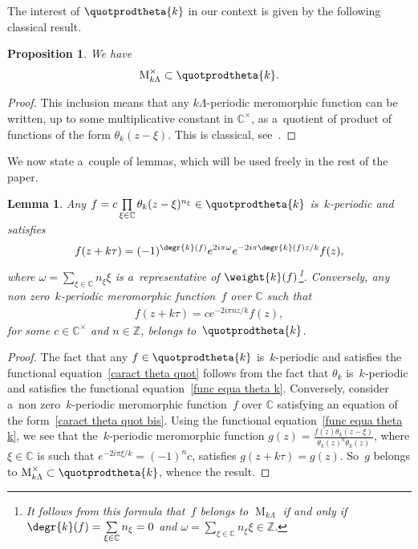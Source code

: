 \documentclass[pdftex]{sigma}
\numberwithin{equation}{section}
\newtheorem{Lemma}[Theorem]{Lemma}
\newtheorem{Proposition}[Theorem]{Proposition}
{ \theoremstyle{definition}
\newtheorem{Definition}[Theorem]{Definition}
\newtheorem{Remark}[Theorem]{Remark} }
\begin{document}
The interest of $\quotprodtheta{k}$ in our context is given by the following classical result.

\begin{Proposition}
We have
\begin{gather*}
\operatorname{M}_{k\Lambda}^{\times} \subset \quotprodtheta{k}.
\end{gather*}
\end{Proposition}

\begin{proof}
This inclusion means that any $k\Lambda$-periodic meromorphic function can be written, up to some multiplicative
constant in $\mathbb C^{\times}$, as a~quotient of product of functions of the form $\theta_{k}(z-\xi)$.
This is classical, see~\cite[Chapter I, Section~6]{Mumford}.
\end{proof}

We now state a~couple of lemmas, which will be used freely in the rest of the paper.

\begin{Lemma}
\label{form precise}
Any $f= c  \prod\limits_{\xi \in \mathbb C} \theta_{k}(z-\xi)^{n_{\xi}} \in \quotprodtheta{k}$
is~$k$-periodic and satisfies
\begin{gather}
\label{caract theta quot}
f(z+k\tau)=(-1)^{\degr{k} (f)} e^{2i\pi \omega} e^{-2i\pi \degr{k} (f) z/k}f(z),
\end{gather}
where   $\omega = \sum\limits_{\xi \in \mathbb C} n_\xi \xi$ is a~representative of $\weight{k}(f)$\footnote{It follows
from this formula that~$f$ belongs to $\operatorname{M}_{k\Lambda}$ if and only if $\degr{k} (f)=\sum\limits_{\xi \in
\mathbb C} n_\xi=0$ and $\omega=\sum\limits_{\xi \in \mathbb C} n_\xi \xi \in \mathbb Z$.}.
Conversely, any non zero~$k$-periodic meromorphic function~$f$ over $\mathbb C$ such that
\begin{gather}
\label{caract theta quot bis}
f(z+k\tau)=c e^{-2i\pi n z/k}f(z),
\end{gather}
for some $c \in \mathbb C^{\times}$ and $n \in \mathbb Z$, belongs to~$\quotprodtheta{k}$.
\end{Lemma}

\begin{proof}
The fact that any $f \in \quotprodtheta{k}$ is~$k$-periodic and satisf\/ies the functional equation~\eqref{caract theta
quot} follows from the fact that $\theta_{k}$ is~$k$-periodic and satisf\/ies the functional equation~\eqref{func equa
theta k}.
Conversely, consider a~non zero~$k$-periodic meromorphic function~$f$ over $\mathbb C$ satisfying an equation of the
form~\eqref{caract theta quot bis}.
Using the functional equation~\eqref{func equa theta k}, we see that the~$k$-periodic meromorphic function
$g(z)=\frac{f(z) \theta_{k}(z-\xi)}{\theta_{k}(z)^{n} \theta_{k}(z)}$, where $\xi \in \mathbb C$ is such that $e^{-2i\pi
\xi/k}=(-1)^{n}c$, satisf\/ies $g(z+k\tau)=g(z)$.
So~$g$ belongs to $\operatorname{M}_{k\Lambda}^{\times} \subset \quotprodtheta{k}$, whence the result.
\end{proof}
\end{document}
